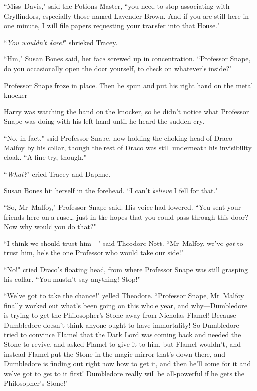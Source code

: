 ``Miss~Davis," said the Potions Master, ``you need to stop associating with Gryffindors, especially those named Lavender Brown. And if you are still here in one minute, I will file papers requesting your transfer into that House."

``\emph{You wouldn't dare!}" shrieked Tracey.

``Hm," Susan Bones said, her face screwed up in concentration. ``Professor Snape, do you occasionally open the door yourself, to check on whatever's inside?"

Professor Snape froze in place. Then he spun and put his right hand on the metal knocker—

Harry was watching the hand on the knocker, so he didn't notice what Professor Snape was doing with his left hand until he heard the sudden cry.

``No, in fact," said Professor Snape, now holding the choking head of Draco Malfoy by his collar, though the rest of Draco was still underneath his invisibility cloak. ``A fine try, though."

``\emph{What?}" cried Tracey and Daphne.

Susan Bones hit herself in the forehead. ``I can't \emph{believe} I fell for that."

``So, Mr~Malfoy," Professor Snape said. His voice had lowered. ``You sent your friends here on a ruse{\ldots} just in the hopes that you could pass through this door? Now why would you do that?"

``I think we should trust him—" said Theodore Nott. ``Mr~Malfoy, we've \emph{got} to trust him, he's the one Professor who would take our side!"

``No!" cried Draco's floating head, from where Professor Snape was still grasping his collar. ``You mustn't say anything! Stop!"

``We've got to take the chance!" yelled Theodore. ``Professor Snape, Mr~Malfoy finally worked out what's been going on this whole year, and why—Dumbledore is trying to get the Philosopher's Stone away from Nicholas Flamel! Because Dumbledore doesn't think anyone ought to have immortality! So Dumbledore tried to convince Flamel that the Dark Lord was coming back and needed the Stone to revive, and asked Flamel to give it to him, but Flamel wouldn't, and instead Flamel put the Stone in the magic mirror that's down there, and Dumbledore is finding out right now how to get it, and then he'll come for it and we've got to get to it first! Dumbledore really will be all-powerful if he gets the Philosopher's Stone!"


